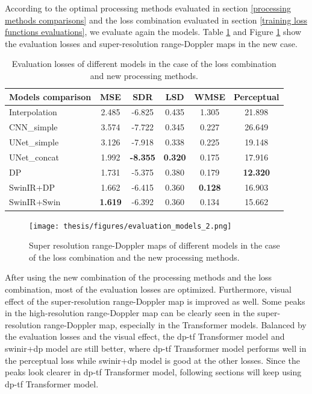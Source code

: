 According to the optimal processing methods evaluated in section \ref{processing methods comparisons} and the loss combination evaluated in section \ref{training loss functions evaluations}, we evaluate again the models. Table \ref{models comparison in the case of the LSD and new processing methods} and Figure \ref{evaluation models 2} show the evaluation losses and super-resolution range-Doppler maps in the new case.

\begin{table}
    \centering
    \caption{Evaluation losses of different models in the case of the loss combination and new processing methods.}
    \label{models comparison in the case of the LSD and new processing methods}
    \begin{tabular}{l|c|c|c|c|c}
        \hline
        Models comparison & MSE & SDR & LSD & WMSE & Perceptual \\
        \hline
        Interpolation & 2.485 & -6.825 & 0.435 & 1.305 & 21.898 \\
        \hline
        CNN\_simple & 3.574 & -7.722 & 0.345 & 0.227 & 26.649 \\
        \hline
        UNet\_simple & 3.126 & -7.918 & 0.338 & 0.225 & 19.148 \\
        \hline
        UNet\_concat & 1.992 & \textbf{-8.355} & \textbf{0.320} & 0.175 & 17.916 \\
        \hline
        DP & 1.731 & -5.375 & 0.380 & 0.179 & \textbf{12.320 }\\
        \hline
        SwinIR+DP & 1.662 & -6.415 & 0.360 & \textbf{0.128} & 16.903 \\
        \hline
        SwinIR+Swin & \textbf{1.619} & -6.392 & 0.360 & 0.134 & 15.662 \\
        \hline
    \end{tabular}
\end{table}

\begin{figure}
    \centering
    \texttt{[image: thesis/figures/evaluation\_models\_2.png]}
    \caption{Super resolution range-Doppler maps of different models in the case of the loss combination and the new processing methods.}
    \label{evaluation models 2}
\end{figure}

After using the new combination of the processing methods and the loss combination, most of the evaluation losses are optimized. Furthermore, visual effect of the super-resolution range-Doppler map is improved as well. Some peaks in the high-resolution range-Doppler map can be clearly seen in the super-resolution range-Doppler map, especially in the Transformer models. Balanced by the evaluation losses and the visual effect, the \gls{dp}-\gls{tf} Transformer model and \gls{swinir}+\gls{dp} model are still better, where \gls{dp}-\gls{tf} Transformer model performs well in the perceptual loss while \gls{swinir}+\gls{dp} model is good at the other losses. Since the peaks look clearer in \gls{dp}-\gls{tf} Transformer model, following sections will keep using \gls{dp}-\gls{tf} Transformer model.


